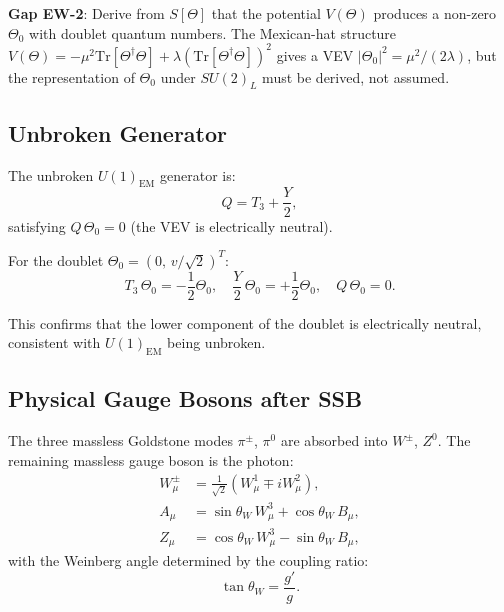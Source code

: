 \documentclass[12pt,a4paper]{article}
\theoremstyle{definition}
\theoremstyle{remark}
\begin{document}
\begin{gapbox}
\textbf{Gap EW-2}: Derive from $S[\Theta]$ that the potential $V(\Theta)$ produces
a non-zero $\Theta_0$ with doublet quantum numbers.  The Mexican-hat structure
$V(\Theta) = -\mu^2 \mathrm{Tr}[\Theta^\dagger\Theta] + \lambda(\mathrm{Tr}[\Theta^\dagger\Theta])^2$
gives a VEV $|\Theta_0|^2 = \mu^2/(2\lambda)$, but the representation of $\Theta_0$
under $SU(2)_L$ must be derived, not assumed.
\end{gapbox}

\subsection{Unbroken Generator}

The unbroken $U(1)_{\mathrm{EM}}$ generator is:
\begin{equation}
  Q = T_3 + \frac{Y}{2},
  \label{eq:sb:Q}
\end{equation}
satisfying $Q\,\Theta_0 = 0$ (the VEV is electrically neutral).

For the doublet $\Theta_0 = (0,\, v/\sqrt{2})^T$:
\begin{equation}
  T_3\,\Theta_0 = -\frac{1}{2}\Theta_0,
  \quad
  \frac{Y}{2}\,\Theta_0 = +\frac{1}{2}\Theta_0,
  \quad
  Q\,\Theta_0 = 0.
  \label{eq:sb:neutrality}
\end{equation}

This confirms that the lower component of the doublet is electrically neutral,
consistent with $U(1)_{\mathrm{EM}}$ being unbroken.

\subsection{Physical Gauge Bosons after SSB}

The three massless Goldstone modes $\pi^{\pm}$, $\pi^0$ are absorbed into
$W^\pm$, $Z^0$.  The remaining massless gauge boson is the photon:
\begin{align}
  W^\pm_\mu &= \frac{1}{\sqrt{2}}(W^1_\mu \mp i W^2_\mu),
  \label{eq:sb:Wpm} \\
  A_\mu     &= \sin\theta_W\, W^3_\mu + \cos\theta_W\, B_\mu,
  \label{eq:sb:Agamma} \\
  Z_\mu     &= \cos\theta_W\, W^3_\mu - \sin\theta_W\, B_\mu,
  \label{eq:sb:Z}
\end{align}
with the Weinberg angle determined by the coupling ratio:
\begin{equation}
  \tan\theta_W = \frac{g'}{g}.
  \label{eq:sb:tanW}
\end{equation}
\end{document}
